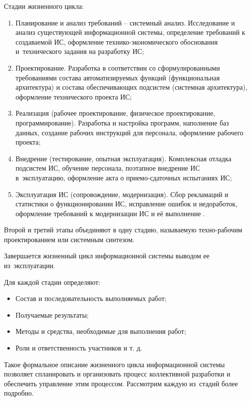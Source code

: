 \documentclass{ou}
\begin{document}
Стадии жизненного цикла:
\begin{enumerate}[leftmargin=0em, itemindent=3.75em, nosep, label=\arabic*)]
\item Планирование и анализ требований -- системный анализ. Исследование и анализ существующей информационной системы, определение требований к создаваемой ИС, оформление технико-экономического обоснования и~технического задания на разработку ИС;
\item Проектирование. Разработка в соответствии со сформулированными требованиями состава автоматизируемых функций (функциональная архитектура) и состава обеспечивающих подсистем (системная архитектура), оформление технического проекта ИС;
\item Реализация (рабочее проектирование, физическое проектирование, программирование). Разработка и настройка программ, наполнение баз данных, создание рабочих инструкций для персонала, оформление рабочего проекта;
\item Внедрение (тестирование, опытная эксплуатация). Комплексная отладка подсистем ИС, обучение персонала, поэтапное внедрение ИС в~эксплуатацию, оформление акта о приемо-сдаточных испытаниях ИС;
\item Эксплуатация ИС (сопровождение, модернизация). Сбор рекламаций и статистики о функционировании ИС, исправление ошибок и недоработок, оформление требований к модернизации ИС и её выполнение \cite{isis_lifecycle}.
\end{enumerate}

Второй и третий этапы объединяют в одну стадию, называемую техно-рабочим проектированием или системным синтезом.

Завершается жизненный цикл информационной системы выводом ее из~эксплуатации.

Для каждой стадии определяют:
\begin{itemize}[label=-, leftmargin=0em, itemindent=3.35em, nosep]
\item Состав и последовательность выполняемых работ;
\item Получаемые результаты;
\item Методы и средства, необходимые для выполнения работ;
\item Роли и ответственность участников и т. д.
\end{itemize}

Такое формальное описание жизненного цикла информационной системы позволяет спланировать и организовать процесс коллективной разработки и обеспечить управление этим процессом. Рассмотрим каждую из~стадий более подробно.
\end{document}
